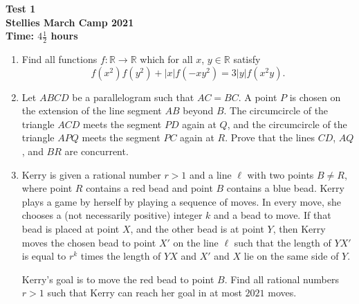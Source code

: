 \documentclass{article}
\begin{document}
\thispagestyle{empty}

\begin{center}
  \textbf{\Large Test 1}
  \\ \vspace{1em}
  \textbf{\large Stellies March Camp 2021}
  \\ \vspace{1em}
  \textbf{\large Time: $4\frac{1}{2}$ hours}
\end{center}

\bigskip

\begin{enumerate}[itemsep=12pt]

\item %
Find all functions $f : \mathbb{R} \to \mathbb{R}$ which for all $x$, $y \in \mathbb{R}$ satisfy
\[ f(x^{2})f(y^{2}) + |x|f(-xy^{2}) = 3|y|f(x^{2}y). \]

\item %
Let $ABCD$ be a parallelogram such that $AC = BC$.
A point $P$ is chosen on the extension of the line segment $AB$ beyond $B$.
The circumcircle of the triangle $ACD$ meets the segment $PD$ again at $Q$, and the circumcircle of the triangle $APQ$ meets the segment $PC$ again at $R$.
Prove that the lines $CD$, $AQ$, and $BR$ are concurrent.

\item %
Kerry is given a rational number $r > 1$ and a line $\ell$ with two points $B \neq R$, where point $R$ contains a red bead and point $B$ contains a blue bead.
Kerry plays a game by herself by playing a sequence of moves.
In every move, she chooses a (not necessarily positive) integer $k$ and a bead to move.
If that bead is placed at point $X$, and the other bead is at point $Y$, then Kerry moves the chosen bead to point $X'$ on the line $\ell$ such that the length of $YX'$ is equal to $r^k$ times the length of $YX$ and $X'$ and $X$ lie on the same side of $Y$.

Kerry's goal is to move the red bead to point $B$.
Find all rational numbers $r > 1$ such that Kerry can reach her goal in at most $2021$ moves.

\end{enumerate}
\end{document}
